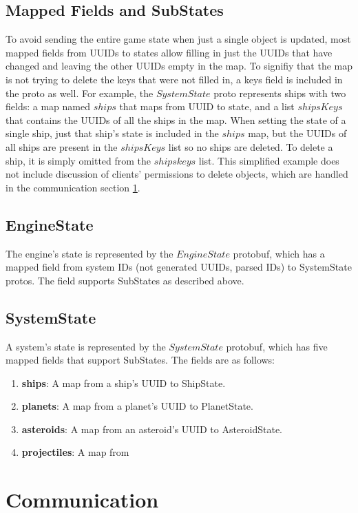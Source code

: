 \documentclass{article}
\begin{document}
\subsection{Mapped Fields and SubStates}
To avoid sending the entire game state when just a single object is updated, most mapped fields from UUIDs to states allow filling in just the UUIDs that have changed and leaving the other UUIDs empty in the map. To signifiy that the map is not trying to delete the keys that were not filled in, a keys field is included in the proto as well. For example, the $SystemState$ proto represents ships with two fields: a map named $ships$ that maps from UUID to state, and a list $shipsKeys$ that contains the UUIDs of all the ships in the map. When setting the state of a single ship, just that ship's state is included in the $ships$ map, but the UUIDs of all ships are present in the $shipsKeys$ list so no ships are deleted. To delete a ship, it is simply omitted from the $shipskeys$ list. This simplified example does not include discussion of clients' permissions to delete objects, which are handled in the communication section \ref{communication}.

\subsection{EngineState}
The engine's state is represented by the $EngineState$ protobuf, which has a mapped field from system IDs (not generated UUIDs, parsed IDs) to SystemState protos. The field supports SubStates as described above.

\subsection{SystemState}
A system's state is represented by the $SystemState$ protobuf, which has five mapped fields that support SubStates. The fields are as follows:
\begin{enumerate}
\item[] \textbf{ships}: A map from a ship's UUID to ShipState.
\item[] \textbf{planets}: A map from a planet's UUID to PlanetState.
\item[] \textbf{asteroids}: A map from an asteroid's UUID to AsteroidState.
\item[] \textbf{projectiles}: A map from 


\end{enumerate}


\section{Communication} \label{communication}
\end{document}
